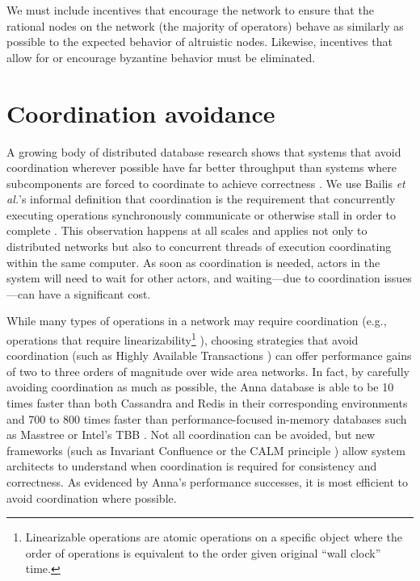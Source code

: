 \documentclass[8pt,fleqn,openany]{book}
\begin{document}
We must include incentives that encourage the network to ensure that the
rational nodes on the network (the majority of operators) behave as similarly
as possible to the expected behavior of altruistic nodes.
Likewise, incentives that allow for or encourage byzantine behavior must
be eliminated.

\section{Coordination avoidance}\label{sec:coordination-avoidance}

A growing body of distributed database research shows that systems that
avoid coordination wherever possible have far better throughput than systems
where subcomponents are forced to coordinate to achieve correctness
\cite{cap1, cap2, consistency-vs-latency, hat, i-confluence, anna,
calm1, calm2}.
We use Bailis {\em et al.}'s informal definition
that coordination is the requirement that concurrently executing operations
synchronously communicate or otherwise stall in order to complete
\cite{i-confluence}.
This observation happens at all scales and applies not only to distributed
networks but also to
concurrent threads of execution coordinating within the same computer.
As soon as coordination is needed, actors in the system will need to wait for
other actors, and waiting---due to coordination issues---can have a significant
cost.

While many types of operations in a network may require coordination
(e.g., operations that require linearizability\footnote{
Linearizable operations are atomic operations on a specific object where
the order of operations is equivalent to the order given original ``wall clock''
time.
}
\cite{jepsen-consistency, hat, vv-consistency}), choosing strategies that
avoid coordination (such as Highly Available Transactions \cite{hat}) can offer
performance gains of two to three orders of magnitude over wide area networks.
In fact, by carefully avoiding coordination as much as possible, the Anna
database is able to be 10 times faster than both Cassandra and Redis in their
corresponding environments and 700 to 800 times faster than
performance-focused in-memory databases such as Masstree or Intel's TBB
\cite{anna, anna-announce}.
Not all coordination can be avoided, but new frameworks (such as Invariant
Confluence \cite{i-confluence} or the CALM principle \cite{calm1, calm2})
allow system architects to understand when coordination is required for
consistency and correctness. As evidenced
by Anna's performance successes, it is most efficient to avoid coordination
where possible.
\end{document}
